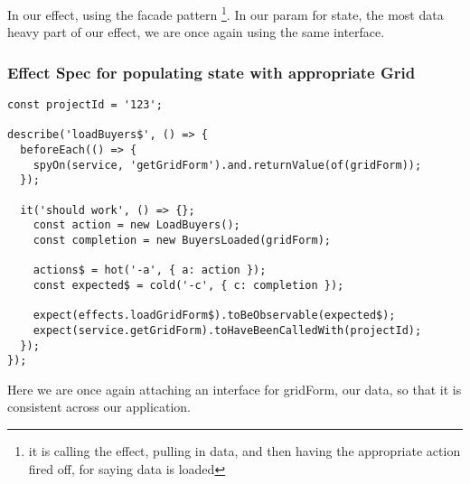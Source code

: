 In our effect, using the facade pattern \footnote{it is calling the effect,
pulling in data, and then having the appropriate action fired off, for saying
data is loaded}. In our param for state, the most data heavy part of our effect,
we are once again using the same interface.

\subsubsection{ Effect Spec for populating state with appropriate Grid }
\begin{lstlisting}
const projectId = '123';

describe('loadBuyers$', () => {
  beforeEach(() => {
    spyOn(service, 'getGridForm').and.returnValue(of(gridForm));
  });

  it('should work', () => {};
    const action = new LoadBuyers();
    const completion = new BuyersLoaded(gridForm);

    actions$ = hot('-a', { a: action });
    const expected$ = cold('-c', { c: completion });

    expect(effects.loadGridForm$).toBeObservable(expected$);
    expect(service.getGridForm).toHaveBeenCalledWith(projectId);
  });
});
\end{lstlisting}

Here we are once again attaching an interface for gridForm, our data, so that it
is consistent across our application.
